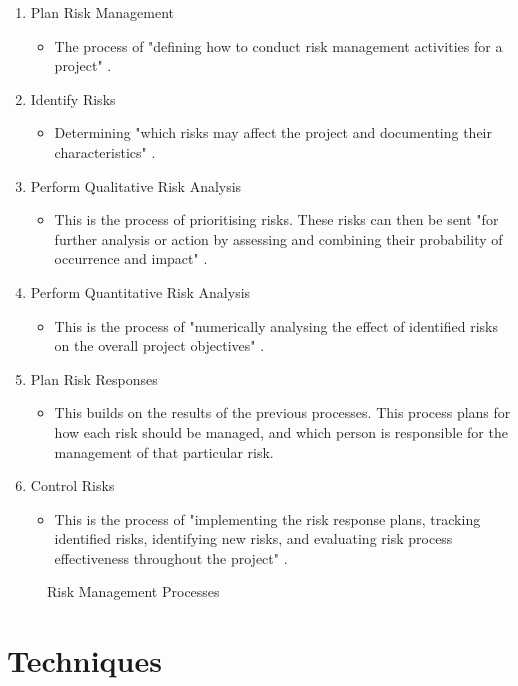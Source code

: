 \begin{enumerate}
\item Plan Risk Management
\begin{itemize}
\item The process of "defining how to conduct risk management activities for a project" \parencite{pmbok}.
\end{itemize}
\item Identify Risks
\begin{itemize}
\item Determining "which risks may affect the project and documenting their characteristics" \parencite{pmbok}.
\end{itemize}
\item Perform Qualitative Risk Analysis
\begin{itemize}
\item This is the process of prioritising risks. These risks can then be sent "for further analysis or action by assessing and combining their probability of occurrence and impact" \parencite{pmbok}.
\end{itemize}
\item Perform Quantitative Risk Analysis
\begin{itemize}
\item This is the process of "numerically analysing the effect of identified risks on the overall project objectives" \parencite{pmbok}.
\end{itemize}
\item Plan Risk Responses
\begin{itemize}
\item This builds on the results of the previous processes. This process plans for how each risk should be managed, and which person is responsible for the management of that particular risk.
\end{itemize}
\item Control Risks
\begin{itemize}
\item This is the process of "implementing the risk response plans, tracking identified risks, identifying new risks, and evaluating risk process effectiveness throughout the project" \parencite{pmbok}.
\end{itemize}
\end{enumerate}
\begin{figure}[H]
\caption{Risk Management Processes}
\label{fig:risks}
\end{figure}

\section{Techniques}

